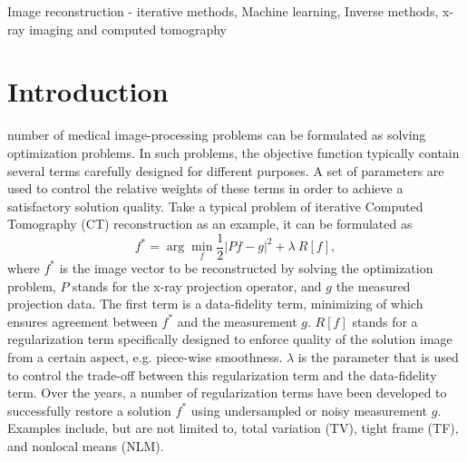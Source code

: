 \documentclass[journal]{IEEEtran}
\begin{document}
\begin{IEEEkeywords}
Image reconstruction - iterative methods, Machine learning, Inverse methods, x-ray imaging and computed tomography
\end{IEEEkeywords}


\ifCLASSOPTIONpeerreview
\fi
\IEEEpeerreviewmaketitle



\section{Introduction}
% 
% 
% 
% 

 number of medical image-processing problems can be formulated as solving optimization problems. In such problems, the objective function typically contain several terms carefully designed for different purposes. A set of parameters are used to control the relative weights of these terms in order to achieve a satisfactory solution quality. Take a typical problem of iterative Computed Tomography (CT) reconstruction as an example, it can be formulated as 
\begin{equation}
\label{Eq:CTreconGeneral}
f^* = \arg\min_f\frac{1}{2}|Pf-g|^2+\lambda~R[f],
\end{equation}
where $f^*$ is the image vector to be reconstructed by solving the optimization problem, $P$ stands for the x-ray projection operator, and $g$ the measured projection data. The first term is a data-fidelity term, minimizing of which ensures agreement between $f^*$ and the measurement $g$. $R[f]$ stands for a regularization term specifically designed to enforce quality of the solution image from a certain aspect, e.g. piece-wise smoothness. $\lambda$ is the parameter that is used to control the trade-off between this regularization term and the data-fidelity term. Over the years, a number of regularization terms have been developed to successfully restore a solution $f^*$ using undersampled or noisy measurement $g$. Examples include, but are not limited to, total variation (TV)\cite{Rudin:PhyD:1992,Sidky:PMB:2008,Jia:MP:2010}, tight frame (TF)\cite{Dong:IAS:2010,Jia:PMB:2011}, and nonlocal means (NLM)\cite{Lou:JSC:2010,Chen:PhyMed:2016,Jia:MP:2012}.
\end{document}
